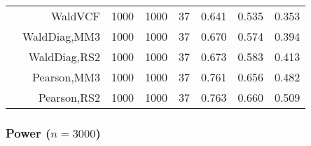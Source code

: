 \documentclass[
]{article}
\begin{document}
\begin{table}[H]
{\begin{tabular}[t]{lrrrrrrr}
\hspace{1em} & WaldVCF & 1000 & 1000 & 37 & 0.641 & 0.535 & 0.353\\

\hspace{1em} & WaldDiag,MM3 & 1000 & 1000 & 37 & 0.670 & 0.574 & 0.394\\

\hspace{1em} & WaldDiag,RS2 & 1000 & 1000 & 37 & 0.673 & 0.583 & 0.413\\

\hspace{1em} & Pearson,MM3 & 1000 & 1000 & 37 & 0.761 & 0.656 & 0.482\\

\hspace{1em} & Pearson,RS2 & 1000 & 1000 & 37 & 0.763 & 0.660 & 0.509\\
\bottomrule
\end{tabular}}
\endgroup{}
\end{table}

\hypertarget{power-n3000}{%
\subsubsection{\texorpdfstring{Power
(\(n=3000\))}{Power (n=3000)}}\label{power-n3000}}
\end{document}
